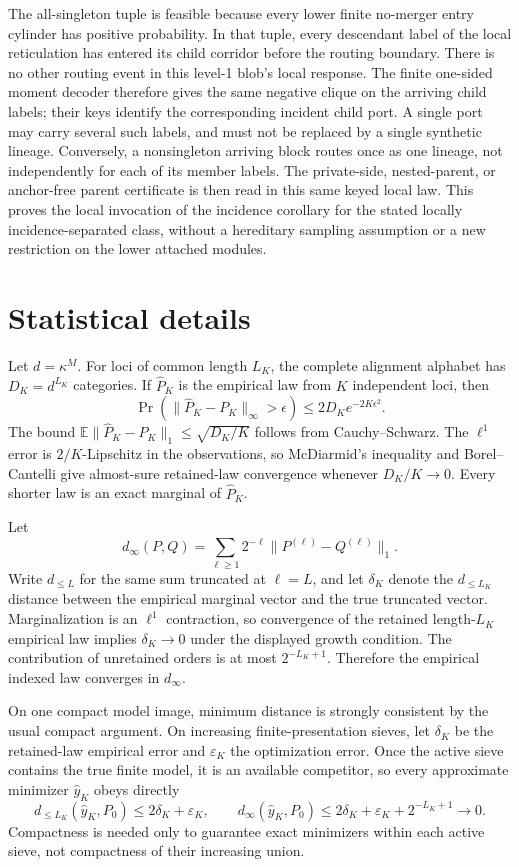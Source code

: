 \documentclass[11pt]{article}
\begin{document}
The all-singleton tuple is feasible because every lower finite no-merger
entry cylinder has positive probability.  In that tuple, every descendant
label of the local reticulation has entered its child corridor before the
routing boundary.  There is no other routing event in this level-1 blob's
local response.  The finite one-sided moment decoder therefore gives the
same negative clique on the arriving child labels; their keys identify the
corresponding incident child port.  A single port may carry several such
labels, and must not be replaced by a single synthetic lineage.  Conversely,
a nonsingleton arriving block routes once as one lineage, not independently
for each of its member labels.  The private-side, nested-parent, or
anchor-free parent certificate is then read in this same keyed local law.
This proves the local invocation of the incidence corollary for the stated
locally incidence-separated class, without a hereditary sampling assumption
or a new restriction on the lower attached modules.

\section{Statistical details}

Let $d=\kappa^M$.  For loci of common length $L_K$, the complete alignment alphabet has $D_K=d^{L_K}$ categories.  If $\widehat P_K$ is the empirical law from $K$ independent loci, then
\[
\Pr(\|\widehat P_K-P_K\|_\infty>\epsilon)
\le 2D_K e^{-2K\epsilon^2}.
\]
The bound $\mathbb E\|\widehat P_K-P_K\|_1\le\sqrt{D_K/K}$ follows from Cauchy--Schwarz.  The $\ell^1$ error is $2/K$-Lipschitz in the observations, so McDiarmid's inequality and Borel--Cantelli give almost-sure retained-law convergence whenever $D_K/K\to0$.  Every shorter law is an exact marginal of $\widehat P_K$.

Let
\[
d_\infty(P,Q)=\sum_{\ell\ge1}2^{-\ell}\|P^{(\ell)}-Q^{(\ell)}\|_1.
\]
Write $d_{\le L}$ for the same sum truncated at $\ell=L$, and let $\delta_K$ denote the $d_{\le L_K}$ distance between the empirical marginal vector and the true truncated vector.  Marginalization is an $\ell^1$ contraction, so convergence of the retained length-$L_K$ empirical law implies $\delta_K\to0$ under the displayed growth condition.
The contribution of unretained orders is at most $2^{-L_K+1}$.  Therefore the empirical indexed law converges in $d_\infty$.

On one compact model image, minimum distance is strongly consistent by the usual compact argument.  On increasing finite-presentation sieves, let $\delta_K$ be the retained-law empirical error and $\varepsilon_K$ the optimization error.  Once the active sieve contains the true finite model, it is an available competitor, so every approximate minimizer $\widehat y_K$ obeys directly
\[
d_{\le L_K}(\widehat y_K,P_0)\le 2\delta_K+\varepsilon_K,
\qquad
d_\infty(\widehat y_K,P_0)
\le 2\delta_K+\varepsilon_K+2^{-L_K+1}\longrightarrow0.
\]
Compactness is needed only to guarantee exact minimizers within each active sieve, not compactness of their increasing union.
\end{document}
